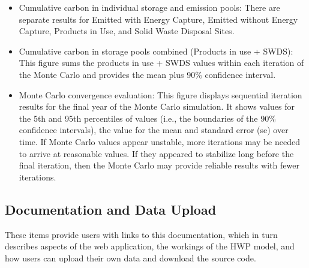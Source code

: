 \documentclass[
  openany]{book}
\providecommand{\tightlist}{%
  \setlength{\itemsep}{0pt}\setlength{\parskip}{0pt}}
\begin{document}
\begin{itemize}
  \begin{itemize}
  \tightlist
  \item
    Cumulative carbon in individual storage and emission pools: There are separate results for Emitted with Energy Capture, Emitted without Energy Capture, Products in Use, and Solid Waste Disposal Sites.\\
  \item
    Cumulative carbon in storage pools combined (Products in use + SWDS): This figure sums the products in use + SWDS values within each iteration of the Monte Carlo and provides the mean plus 90\% confidence interval.\\
  \item
    Monte Carlo convergence evaluation: This figure displays sequential iteration results for the final year of the Monte Carlo simulation. It shows values for the 5th and 95th percentiles of values (i.e., the boundaries of the 90\% confidence intervals), the value for the mean and standard error (se) over time. If Monte Carlo values appear unstable, more iterations may be needed to arrive at reasonable values. If they appeared to stabilize long before the final iteration, then the Monte Carlo may provide reliable results with fewer iterations.
  \end{itemize}
\end{itemize}

\hypertarget{app-doc}{%
\subsection{Documentation and Data Upload}\label{app-doc}}

These items provide users with links to this documentation, which in turn describes aspects of the web application, the workings of the HWP model, and how users can upload their own data and download the source code.
\end{document}
